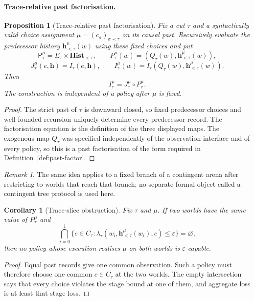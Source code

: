 \documentclass[11pt]{article}
\theoremstyle{plain}
\newtheorem{proposition}[theorem]{Proposition}
\newtheorem{corollary}[theorem]{Corollary}
\theoremstyle{definition}
\theoremstyle{remark}
\newtheorem{remark}[theorem]{Remark}
\newcommand{\eps}{\varepsilon}
\begin{document}
\paragraph{Trace-relative past factorisation.}

\begin{proposition}[Trace-relative past factorisation]
\label{prop:trace-relative-past}
Fix a cut $\tau$ and a syntactically valid choice assignment
$\mu=(c_\sigma)_{\sigma\prec\tau}$ on its causal past. Recursively evaluate the
predecessor history $\mathbf h_{<\tau}^\mu(w)$ using these fixed choices and
put
\[
\mathsf P_\tau^\mu=E_\tau\times\mathbf{Hist}_{<\tau},
\qquad
P_\tau^\mu(w)=(Q_\tau(w),\mathbf h_{<\tau}^\mu(w)),
\]
\[
J_\tau^\mu(e,\mathbf h)=I_\tau(e,\mathbf h),
\qquad
I_\tau^\mu(w)=I_\tau(Q_\tau(w),\mathbf h_{<\tau}^\mu(w)).
\]
Then
\[
I_\tau^\mu=J_\tau^\mu\circ P_\tau^\mu.
\]
The construction is independent of a policy after $\mu$ is fixed.
\end{proposition}

\begin{proof}
The strict past of $\tau$ is downward closed, so fixed predecessor choices and
well-founded recursion uniquely determine every predecessor record. The
factorisation equation is the definition of the three displayed maps. The
exogenous map $Q_\tau$ was specified independently of the observation interface
and of every policy, so this is a past factorisation of the form required in
Definition~\ref{def:past-factor}.
\end{proof}

\begin{remark}
The same idea applies to a fixed branch of a contingent arena after restricting
to worlds that reach that branch; no separate formal object called a contingent
tree protocol is used here.
\end{remark}

\begin{corollary}[Trace-slice obstruction]
\label{cor:trace-slice-obstruction}
Fix $\tau$ and $\mu$. If two worlds have the same value of
$P_\tau^\mu$ and
\[
\bigcap_{i=0}^1
\{c\in C_\tau:
\lambda_\tau(w_i,\mathbf h_{<\tau}^\mu(w_i),c)\le\eps\}
=\varnothing,
\]
then no policy whose execution realises $\mu$ on both worlds is
$\eps$-capable.
\end{corollary}

\begin{proof}
Equal past records give one common observation. Such a policy must therefore
choose one common $c\in C_\tau$ at the two worlds. The empty intersection says
that every choice violates the stage bound at one of them, and aggregate loss is
at least that stage loss.
\end{proof}
\end{document}
